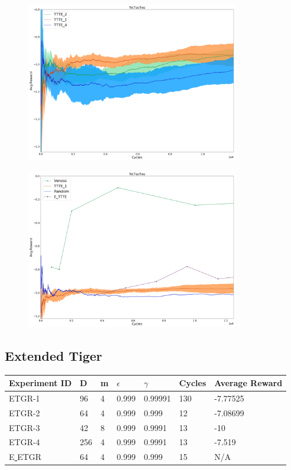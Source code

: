 \documentclass{article}
\theoremstyle{definition}
\newtheorem{primary statistics}[definition]{Primary Statistics}
\newtheorem{auxiliary statistics}[definition]{Auxiliary Statistics}
\begin{document}
 \begin{figure}[h]
 \centering
    \includegraphics[width=9.3cm]{4_TicTacToe}
\end{figure}

 \begin{figure}[h]
 \centering
    \includegraphics[width=9.3cm]{TicTacToe}
\end{figure}

\newpage

\subsection{Extended Tiger}
 \begin{tabular}{|l|l|l|l|l|l|l|}
 \hline \centering
 Experiment ID& D & m & $\epsilon$ & $\gamma$ & Cycles & Average Reward \\ \hline
ETGR-1 & 96        & 4           & 0.999       & 0.99991           & 130    & -7.77525        \\ \hline
ETGR-2 & 64        & 4           & 0.999       & 0.999             & 12     & -7.08699       \\ \hline
ETGR-3 & 42        & 8           & 0.999       & 0.9991            & 13     & -10             \\ \hline
ETGR-4 & 256       & 4           & 0.999       & 0.9991            & 13     & -7.519  \\ \hline 
E\underline{ }ETGR & 64       & 4           & 0.999       & 0.999            & 15     & N/A  \\ \hline    
\end{tabular}
\end{document}
